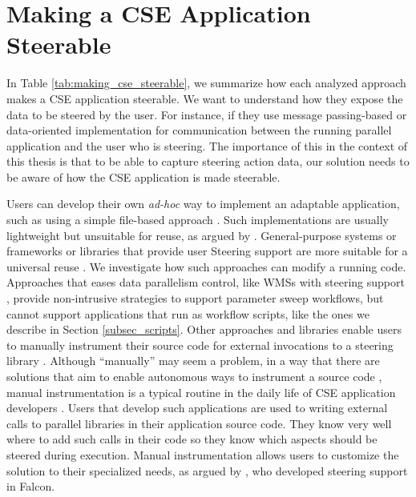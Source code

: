 \section{Making a CSE Application Steerable}

In Table \ref{tab:making_cse_steerable}, we summarize how each analyzed approach makes a CSE application steerable. We want to understand how they expose the data to be steered by the user. For instance, if they use message passing-based or
data-oriented implementation for communication between the running
parallel application and the user who is steering. The importance of this in the context of this thesis is that to be able to capture steering action data, our solution needs to be aware of how the CSE application is made steerable.




Users can develop their own \textit{ad-hoc} way to implement
an adaptable application, such as using a simple file-based approach
\cite{Camata2018In}.
Such implementations are usually lightweight but unsuitable for reuse,
as argued by \citet{Bauer2016In}.
General-purpose systems or frameworks or libraries that provide
user Steering support are more suitable for a universal reuse
\cite{Bauer2016In}.
We investigate how such approaches can modify a running code.
Approaches that eases data parallelism control, like WMSs with steering support
\cite{Dias2015Data-centric,Nguyen2014WorkWays:,Souza2017Data},
provide non-intrusive strategies to support parameter sweep workflows, but cannot support applications that run as workflow scripts, like the ones we describe in Section \ref{subsec_scripts}.
Other approaches and libraries enable
users to manually instrument their source code for external invocations
to a steering library \cite{Ayachit2016Performance,Bauer2016In,MulderSurvey}.
Although ``manually'' may seem a problem, in a way that there are solutions that aim to enable autonomous ways to instrument a source code
\cite{Pimentel2017noWorkflow:},
manual instrumentation is a typical routine in the daily life of CSE
application developers \cite{Bauer2016In,Silva2018Capturing}.
Users that develop such applications are used to writing external calls
to parallel libraries in their application source code. They know very
well where to add such calls in their code so they know which aspects
should be steered during execution. Manual instrumentation allows users
to customize the solution to their specialized needs, as argued by \citet{Gu1995Falcon:},
who developed steering support in Falcon.



